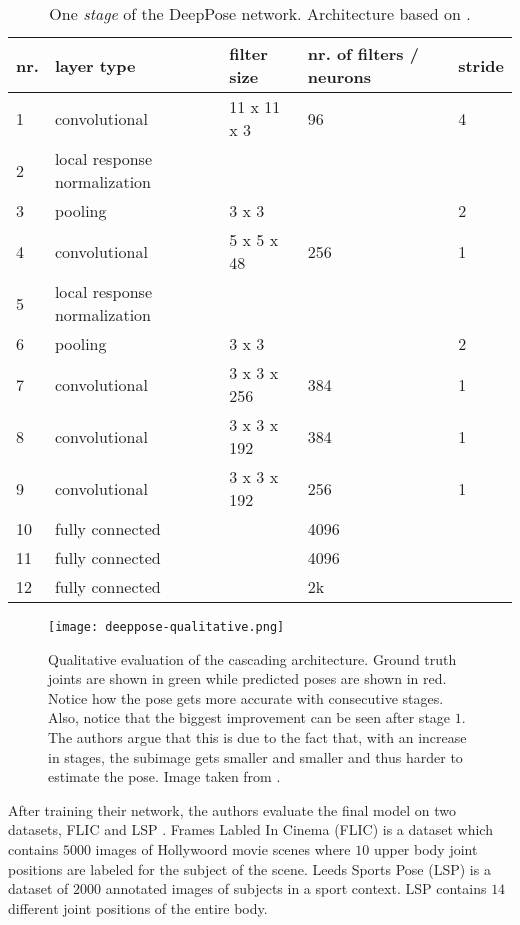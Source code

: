 \begin{table}[]
    \begin{tabular}{|l|l|l|l|l|}
    \hline
    \textbf{nr.} & \textbf{layer type} & \textbf{filter size} & \textbf{nr. of filters / neurons} & \textbf{stride} \\ \hline
    1 & convolutional & 11 x 11 x 3 & 96 & 4 \\
    2 & local response normalization &  &  &  \\
    3 & pooling & 3 x 3 &  & 2 \\ \hline
    4 & convolutional & 5 x 5 x 48 & 256 & 1 \\
    5 & local response normalization &  &  &  \\ 
    6 & pooling & 3 x 3 &  & 2 \\ \hline
    7 & convolutional & 3 x 3 x 256 & 384 & 1 \\
    8 & convolutional & 3 x 3 x 192 & 384 & 1 \\
    9 & convolutional & 3 x 3 x 192 & 256 & 1 \\ \hline
    10 & fully connected &  & 4096 &  \\
    11 & fully connected &  & 4096 &  \\ \hline
    12 & fully connected &  & 2k &  \\ \hline
    \end{tabular}
    \caption{One \textit{stage} of the DeepPose network. Architecture based on \cite{krizhevsky_imagenet_2012}.}
    \label{tab:deeppose-architecture}
\end{table}

\begin{figure}[htb!]
    \centering
    \texttt{[image: deeppose-qualitative.png]}
    \caption{Qualitative evaluation of the cascading architecture. Ground truth joints are shown in green while predicted poses are shown in red. Notice how the pose gets more accurate with consecutive stages. Also, notice that the biggest improvement can be seen after stage $1$. The authors argue that this is due to the fact that, with an increase in stages, the subimage gets smaller and smaller and thus harder to estimate the pose. Image taken from \cite{toshev_deeppose:_2014}.}
    \label{fig:deeppose-qualitative}
\end{figure}

After training their network, the authors evaluate the final model on two datasets, FLIC \cite{sapp_modec:_2013} and LSP \cite{johnson_clustered_2010}.
Frames Labled In Cinema (FLIC) is a dataset which contains $5000$ images of Hollywoord movie scenes where $10$ upper body joint positions are labeled for the subject of the scene.
Leeds Sports Pose (LSP) is a dataset of $2000$ annotated images of subjects in a sport context.
LSP contains $14$ different joint positions of the entire body.

